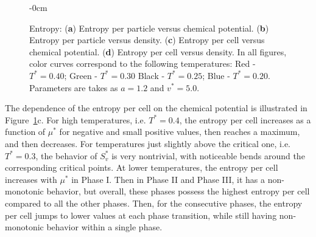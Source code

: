 \documentclass[entropy,article,submit,pdftex,moreauthors]{Definitions/mdpi}
\begin{document}
\begin{figure}[H]
\begin{adjustwidth}{-\extralength}{0cm}
		\end{adjustwidth}
	\caption{Entropy: (\textbf{a}) Entropy per particle versus chemical potential. (\textbf{b}) Entropy per particle versus density. (\textbf{c}) Entropy per cell versus chemical potential. (\textbf{d}) Entropy per cell versus density. In all figures, color curves correspond to the following temperatures: Red - $T^*=0.40$; Green - $T^*=0.30$ Black - $T^*=0.25$; Blue - $T^* = 0.20$. Parameters are takes as $a=1.2$ and $v^*=5.0$.\label{fig:entropy3}}
\end{figure} 

The dependence of the entropy per cell on the chemical potential is illustrated in Figure~\ref{fig:entropy3}c. For high temperatures, i.e. $T^*=0.4$, the entropy per cell increases as a function of $\mu^*$ for negative and small positive values, then reaches a maximum, and then decreases. For temperatures just slightly above the critical one, i.e. $T^*=0.3$, the behavior of $S^*_v$ is very nontrivial, with noticeable bends around the corresponding critical points. At lower temperatures, the entropy per cell increases with $\mu^*$ in Phase I. Then in Phase II and Phase III, it has a non-monotonic behavior, but overall, these phases possess the highest entropy per cell compared to all the other phases. Then, for the consecutive phases, the entropy per cell jumps to lower values at each phase transition, while still having non-monotonic behavior within a single phase. 
\end{document}
